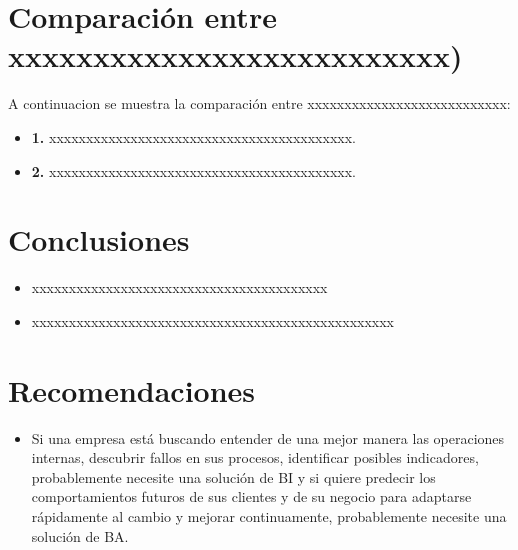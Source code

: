 \documentclass[preprint,12pt]{elsarticle}
\begin{document}
\cite{referenciajohanna1}

	



\section{Comparación entre  xxxxxxxxxxxxxxxxxxxxxxxxxx)}
A continuacion se muestra la comparación entre xxxxxxxxxxxxxxxxxxxxxxxxxxx:
	
	\begin{itemize}

	\item{\textbf{1.}} xxxxxxxxxxxxxxxxxxxxxxxxxxxxxxxxxxxxxxxxx.
	\item{\textbf{2.}} xxxxxxxxxxxxxxxxxxxxxxxxxxxxxxxxxxxxxxxxx.

\end{itemize}


\section{Conclusiones}

	\begin{itemize}
\item xxxxxxxxxxxxxxxxxxxxxxxxxxxxxxxxxxxxxxxx
\item xxxxxxxxxxxxxxxxxxxxxxxxxxxxxxxxxxxxxxxxxxxxxxxxx
	\end{itemize}



\section{Recomendaciones}	
	\begin{itemize}

	\item Si una empresa está buscando entender de una mejor manera las operaciones internas, descubrir fallos en sus procesos, identificar posibles indicadores, probablemente necesite una solución de BI y si quiere predecir los comportamientos futuros de sus clientes y de su negocio para adaptarse rápidamente al cambio y mejorar continuamente, probablemente necesite una solución de BA.
	\end{itemize}

	
	\newpage
	
		


\end{document}
